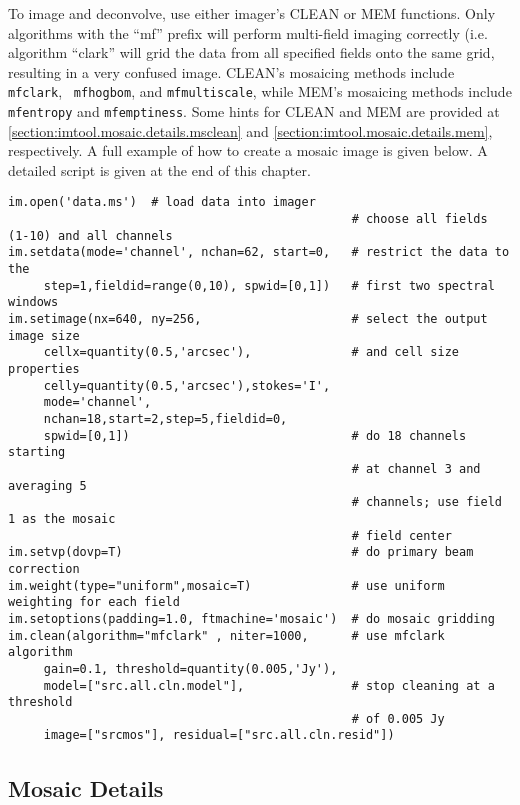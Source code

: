 To image and deconvolve, use either imager's CLEAN or MEM functions.
Only algorithms with the ``mf'' prefix will perform multi-field
imaging correctly (i.e. algorithm ``clark'' will grid the data from
all specified fields onto the same grid, resulting in a very confused
image.  CLEAN's mosaicing methods include {\tt mfclark}, {\tt
mfhogbom}, and {\tt mfmultiscale}, while MEM's mosaicing methods
include {\tt mfentropy} and {\tt mfemptiness}.  Some hints for CLEAN
and MEM are provided at \ref{section:imtool.mosaic.details.msclean} and
\ref{section:imtool.mosaic.details.mem}, 
respectively.  A full example of how
to create a mosaic image is given below. A detailed script is given at
the end of this chapter.

\small
\begin{verbatim}
im.open('data.ms')  # load data into imager
                                                # choose all fields (1-10) and all channels
im.setdata(mode='channel', nchan=62, start=0,   # restrict the data to the
     step=1,fieldid=range(0,10), spwid=[0,1])   # first two spectral windows
im.setimage(nx=640, ny=256,                     # select the output image size
     cellx=quantity(0.5,'arcsec'),              # and cell size properties
     celly=quantity(0.5,'arcsec'),stokes='I',
     mode='channel',
     nchan=18,start=2,step=5,fieldid=0,
     spwid=[0,1])                               # do 18 channels starting
                                                # at channel 3 and averaging 5
                                                # channels; use field 1 as the mosaic
                                                # field center
im.setvp(dovp=T)                                # do primary beam correction
im.weight(type="uniform",mosaic=T)              # use uniform weighting for each field
im.setoptions(padding=1.0, ftmachine='mosaic')  # do mosaic gridding
im.clean(algorithm="mfclark" , niter=1000,      # use mfclark algorithm
     gain=0.1, threshold=quantity(0.005,'Jy'),
     model=["src.all.cln.model"],               # stop cleaning at a threshold
                                                # of 0.005 Jy
     image=["srcmos"], residual=["src.all.cln.resid"])
\end{verbatim}
\normalsize


\subsection{Mosaic Details}
\label{section:imtool.mosaic.details}

